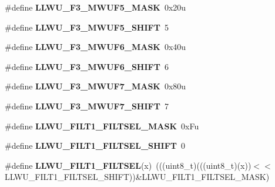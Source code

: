 \begin{DoxyCompactItemize}
\item 
\#define {\bfseries L\+L\+W\+U\+\_\+\+F3\+\_\+\+M\+W\+U\+F5\+\_\+\+M\+A\+SK}~0x20u\hypertarget{group__LLWU__Register__Masks_gaeb14754fa2d5b4c1fd50b9df98f11b01}{}\label{group__LLWU__Register__Masks_gaeb14754fa2d5b4c1fd50b9df98f11b01}

\item 
\#define {\bfseries L\+L\+W\+U\+\_\+\+F3\+\_\+\+M\+W\+U\+F5\+\_\+\+S\+H\+I\+FT}~5\hypertarget{group__LLWU__Register__Masks_gac8a9d2de72a5034fae66714d25aa5f33}{}\label{group__LLWU__Register__Masks_gac8a9d2de72a5034fae66714d25aa5f33}

\item 
\#define {\bfseries L\+L\+W\+U\+\_\+\+F3\+\_\+\+M\+W\+U\+F6\+\_\+\+M\+A\+SK}~0x40u\hypertarget{group__LLWU__Register__Masks_gabd1f915448c7918a8aabc74239d7e773}{}\label{group__LLWU__Register__Masks_gabd1f915448c7918a8aabc74239d7e773}

\item 
\#define {\bfseries L\+L\+W\+U\+\_\+\+F3\+\_\+\+M\+W\+U\+F6\+\_\+\+S\+H\+I\+FT}~6\hypertarget{group__LLWU__Register__Masks_gaab649d98d5d8eb9f2f272649ace225c4}{}\label{group__LLWU__Register__Masks_gaab649d98d5d8eb9f2f272649ace225c4}

\item 
\#define {\bfseries L\+L\+W\+U\+\_\+\+F3\+\_\+\+M\+W\+U\+F7\+\_\+\+M\+A\+SK}~0x80u\hypertarget{group__LLWU__Register__Masks_ga2ddb11dc5e9f8a8404ccf99f10046b5a}{}\label{group__LLWU__Register__Masks_ga2ddb11dc5e9f8a8404ccf99f10046b5a}

\item 
\#define {\bfseries L\+L\+W\+U\+\_\+\+F3\+\_\+\+M\+W\+U\+F7\+\_\+\+S\+H\+I\+FT}~7\hypertarget{group__LLWU__Register__Masks_gaee31def5b074844cbf46f9d7e54d2d4f}{}\label{group__LLWU__Register__Masks_gaee31def5b074844cbf46f9d7e54d2d4f}

\item 
\#define {\bfseries L\+L\+W\+U\+\_\+\+F\+I\+L\+T1\+\_\+\+F\+I\+L\+T\+S\+E\+L\+\_\+\+M\+A\+SK}~0x\+Fu\hypertarget{group__LLWU__Register__Masks_gaa44e21d07f509d1f5d6cec9da32ab8ab}{}\label{group__LLWU__Register__Masks_gaa44e21d07f509d1f5d6cec9da32ab8ab}

\item 
\#define {\bfseries L\+L\+W\+U\+\_\+\+F\+I\+L\+T1\+\_\+\+F\+I\+L\+T\+S\+E\+L\+\_\+\+S\+H\+I\+FT}~0\hypertarget{group__LLWU__Register__Masks_gaab2a7991b2b135f0557b1b41cc3528f7}{}\label{group__LLWU__Register__Masks_gaab2a7991b2b135f0557b1b41cc3528f7}

\item 
\#define {\bfseries L\+L\+W\+U\+\_\+\+F\+I\+L\+T1\+\_\+\+F\+I\+L\+T\+S\+EL}(x)~(((uint8\+\_\+t)(((uint8\+\_\+t)(x))$<$$<$L\+L\+W\+U\+\_\+\+F\+I\+L\+T1\+\_\+\+F\+I\+L\+T\+S\+E\+L\+\_\+\+S\+H\+I\+FT))\&L\+L\+W\+U\+\_\+\+F\+I\+L\+T1\+\_\+\+F\+I\+L\+T\+S\+E\+L\+\_\+\+M\+A\+SK)\hypertarget{group__LLWU__Register__Masks_ga9d7876a517542c2fa363b9f15d375d69}{}\label{group__LLWU__Register__Masks_ga9d7876a517542c2fa363b9f15d375d69}


\end{DoxyCompactItemize}
